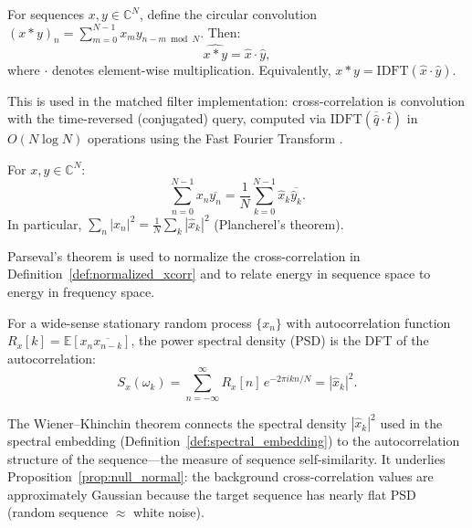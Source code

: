 \begin{theorem}
For sequences $x, y \in \mathbb{C}^N$, define the circular convolution
$(x * y)_n = \sum_{m=0}^{N-1} x_m y_{n-m \bmod N}$. Then:
\begin{equation}
  \widehat{x * y} = \hat{x} \cdot \hat{y},
  \label{eq:convolution_theorem}
\end{equation}
where $\cdot$ denotes element-wise multiplication. Equivalently,
$x * y = \mathrm{IDFT}(\hat{x} \cdot \hat{y})$.
\end{theorem}

This is used in the matched filter implementation: cross-correlation is
convolution with the time-reversed (conjugated) query, computed via
$\mathrm{IDFT}(\overline{\hat{q}} \cdot \hat{t})$ in $O(N \log N)$ operations
using the Fast Fourier Transform \citep{cooley1965algorithm}.

\begin{theorem}
For $x, y \in \mathbb{C}^N$:
\begin{equation}
  \sum_{n=0}^{N-1} x_n \overline{y_n} = \frac{1}{N} \sum_{k=0}^{N-1} \hat{x}_k \overline{\hat{y}_k}.
  \label{eq:parseval}
\end{equation}
In particular, $\sum_n |x_n|^2 = \frac{1}{N}\sum_k |\hat{x}_k|^2$ (Plancherel's theorem).
\end{theorem}

Parseval's theorem is used to normalize the cross-correlation in
Definition~\ref{def:normalized_xcorr} and to relate energy in sequence space
to energy in frequency space.

\begin{theorem}
For a wide-sense stationary random process $\{x_n\}$ with autocorrelation
function $R_x[k] = \mathbb{E}[x_n \overline{x_{n-k}}]$, the power spectral
density (PSD) is the DFT of the autocorrelation:
\begin{equation}
  S_x(\omega_k) = \sum_{n=-\infty}^{\infty} R_x[n] \, e^{-2\pi ikn/N} = |\hat{x}_k|^2.
  \label{eq:wiener_khinchin}
\end{equation}
\end{theorem}

The Wiener--Khinchin theorem connects the spectral density $|\hat{x}_k|^2$
used in the spectral embedding (Definition~\ref{def:spectral_embedding}) to
the autocorrelation structure of the sequence---the measure of sequence
self-similarity. It underlies Proposition~\ref{prop:null_normal}: the
background cross-correlation values are approximately Gaussian because
the target sequence has nearly flat PSD (random sequence $\approx$ white noise).

